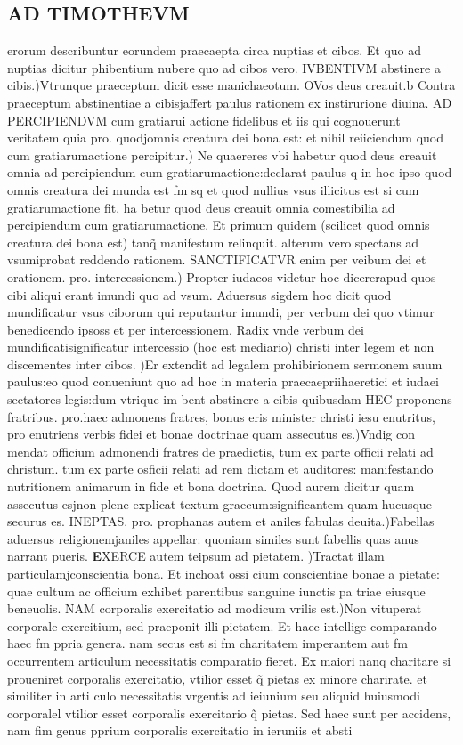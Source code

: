 \documentclass{article}
\begin{document}
\begin{pages}
\section*{AD TIMOTHEVM }\pstart erorum describuntur eorundem praecaepta circa nuptias et cibos. Et quo ad nuptias dicitur phibentium nubere quo ad cibos vero. IVBENTIVM abstinere a cibis.)Vtrunque praeceptum dicit esse manichaeotum. OVos deus creauit.b Contra praeceptum abstinentiae a cibisjaffert paulus rationem ex instirurione diuina. AD PERCIPIENDVM cum gratiarui actione fidelibus et iis qui cognouerunt veritatem quia pro. quodjomnis creatura dei bona est: et nihil reiiciendum quod cum gratiarumactione percipitur.) Ne quaereres vbi habetur quod deus creauit omnia ad percipiendum cum gratiarumactione:declarat paulus q in hoc ipso quod omnis creatura dei munda est fm sq et quod nullius vsus illicitus est si cum gratiarumactione fit, ha betur quod deus creauit omnia comestibilia ad percipiendum cum gratiarumactione. Et primum quidem (scilicet quod omnis creatura dei bona est) tanq̃ manifestum relinquit. alterum vero spectans ad vsumiprobat reddendo rationem. SANCTIFICATVR enim per veibum dei et orationem. pro. intercessionem.) Propter iudaeos videtur hoc dicererapud quos cibi aliqui erant imundi quo ad vsum. Aduersus sigdem hoc dicit quod mundificatur vsus ciborum qui reputantur imundi, per verbum dei quo vtimur benedicendo ipsoss et per intercessionem. Radix vnde verbum dei mundificatisignificatur intercessio (hoc est mediario) christi inter legem et non discementes inter cibos. )Er extendit ad legalem prohibirionem sermonem suum paulus:eo quod conueniunt quo ad hoc in materia praecaepriihaeretici et iudaei sectatores legis:dum vtrique im bent abstinere a cibis quibusdam HEC proponens fratribus. pro.haec admonens fratres, bonus eris minister christi iesu enutritus, pro enutriens verbis fidei et bonae doctrinae quam assecutus es.)Vndig con mendat officium admonendi fratres de praedictis, tum ex parte officii relati ad christum. tum ex parte osficii relati ad rem dictam et auditores: manifestando nutritionem animarum in fide et bona doctrina. Quod aurem dicitur quam assecutus esjnon plene explicat textum graecum:significantem quam hucusque securus es. INEPTAS. pro. prophanas autem et aniles fabulas deuita.)Fabellas aduersus religionemjaniles appellar: quoniam similes sunt fabellis quas anus narrant pueris.  \pend\pstart \huge\textbf{E}\normalsize XERCE autem teipsum ad pietatem. )Tractat illam particulamjconscientia bona. Et inchoat ossi cium conscientiae bonae a pietate: quae cultum ac officium exhibet parentibus sanguine iunctis pa triae eiusque beneuolis. NAM corporalis exercitatio ad modicum vrilis est.)Non vituperat corporale exercitium, sed praeponit illi pietatem. Et haec intellige comparando haec fm ppria genera. nam secus est si fm charitatem imperantem aut fm occurrentem articulum necessitatis comparatio fieret. Ex maiori nanq charitare si proueniret corporalis exercitatio, vtilior esset q̃ pietas ex minore charirate. et similiter in arti culo necessitatis vrgentis ad ieiunium seu aliquid huiusmodi corporalel vtilior esset corporalis exercitario q̃ pietas. Sed haec sunt per accidens, nam fim genus pprium corporalis exercitatio in ieruniis et absti 
\end{pages}
\end{document}

